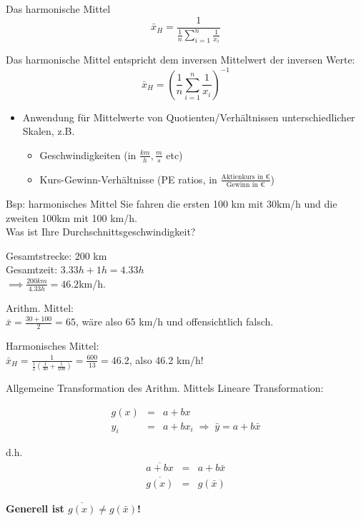 \documentclass[
  10pt,
  ignorenonframetext,
]{beamer}
\providecommand{\tightlist}{%
  \setlength{\itemsep}{0pt}\setlength{\parskip}{0pt}}
\begin{document}
\begin{frame}{Das harmonische Mittel}
\label{das-harmonische-mittel}
\begin{displaymath}
    \bar x_H = \frac{1}{\frac{1}{n} \sum_{i=1}^{n} \frac{1}{x_i}}
\end{displaymath}

Das harmonische Mittel entspricht dem inversen Mittelwert der inversen
Werte: \begin{displaymath}
   \bar x_H = \left(\frac{1}{n} \sum_{i=1}^n   \frac{1}{x_i}\right)^{-1}
\end{displaymath}

\begin{itemize}
\tightlist
\item
  Anwendung für Mittelwerte von Quotienten/Verhältnissen
  unterschiedlicher Skalen, z.B.

  \begin{itemize}
  \tightlist
  \item
    Geschwindigkeiten (in \(\tfrac{km}{h}, \tfrac{m}{s}\) etc)
  \item
    Kurs-Gewinn-Verhältnisse (PE ratios, in
    \(\tfrac{\text{Aktienkurs in }€}{\text{Gewinn in }€}\))
  \end{itemize}
\end{itemize}
\end{frame}

\begin{frame}{Bsp: harmonisches Mittel}
\label{bsp-harmonisches-mittel}
Sie fahren die ersten 100 km mit 30km/h und die zweiten 100km mit 100
km/h.\\
Was ist Ihre Durchschnittsgeschwindigkeit?

Gesamtstrecke: \(200\) km\\
Gesamtzeit: \(3.33 h +  1h = 4.33h\)\\
\(\implies \frac{200 km}{4.33 h} = 46.2\)km/h.

Arithm. Mittel:\\
\(\bar x = \frac{30 + 100}{2} = 65\), wäre also 65 km/h und
offensichtlich falsch.

Harmonisches Mittel:\\
\(\bar x_H = \frac{1}{\tfrac{1}{2}\left(\tfrac{1}{30}+ \tfrac{1}{100}\right)} = \tfrac{600}{13} = 46.2\),
also 46.2 km/h!
\end{frame}

\begin{frame}{Allgemeine Transformation des Arithm. Mittels}
\label{allgemeine-transformation-des-arithm.-mittels}
Lineare Transformation:

\begin{eqnarray*}
  g(x) &=& a + bx \\
  y_i &=& a + bx_i \;\Rightarrow\; \bar y = a + b \bar x
\end{eqnarray*}

d.h. \begin{eqnarray*}
  \overline{a + bx} &=& a + b \bar x \\
  \overline{g(x)} &=& g(\bar x)
\end{eqnarray*}

\textbf{Generell ist \(\overline{g(x)} \neq g(\bar x)\)!}
\end{frame}
\end{document}
